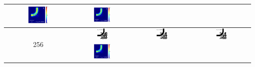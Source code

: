 \begin{table}[H]
\begin{tabular}{|c|c|c|c|}
      \includegraphics[width=0.33\textwidth]{image/results/bend/L-BFGS-B/visualize_field_disc_128.png} &
      \includegraphics[width=0.33\textwidth]{image/results/bend/L-BFGS-B/visualize_field_fab_128.png} \\
    \hline
      \multirow{2}{*}{256} &
      \includegraphics[width=0.20\textwidth]{image/results/bend/L-BFGS-B/visualize_eps_cont_256.png} &
      \includegraphics[width=0.20\textwidth]{image/results/bend/L-BFGS-B/visualize_eps_disc_256.png} &
      \includegraphics[width=0.20\textwidth]{image/results/bend/L-BFGS-B/visualize_eps_fab_256.png} \\
      \cline{2-4}
      &
      \includegraphics[width=0.33\textwidth]{image/results/bend/L-BFGS-B/visualize_field_cont_256.png} &

\end{tabular}
\end{table}
